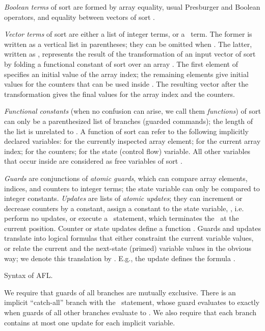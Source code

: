 \emph{Boolean terms}   of sort  are formed by array equality, usual Presburger and Boolean operators, and equality between vectors of sort .

\emph{Vector terms}  of sort  are either a list of  integer terms, or a \Fold\ term. The former is written as a vertical list in parentheses; they can be omitted when . The latter, written as , represents the result of the transformation of an input vector  of sort  by folding a functional constant  of sort  over an array .  The first element of  specifies an initial value of the array index; the remaining elements give initial values for the counters that can be used inside . The resulting vector after the transformation gives the final values for the array index and the counters.

\emph{Functional constants} (when no confusion can arise, we call them  \emph{functions})  of sort  can only be  a parenthesized list of branches (guarded commands); the length of the list is unrelated to . A function  of sort  can refer to the following implicitly declared variables:  for the currently inspected array element;  for the current array index;  for the counters;  for the state (control flow) variable. All other variables that occur inside  are considered as free variables of sort . 

\emph{Guards} are conjunctions of \emph{atomic guards}, which can compare array elements, indices, and counters to integer terms; the state variable can only be compared  to integer constants. 
\emph{Updates} are lists of \emph{atomic updates}; they can increment or decrease counters by a constant, assign a constant to the state variable, \Skip, i.e. perform no updates, or execute a \Break\ statement, which terminates the \Fold\ at the current position.  Counter or state updates define a function .
Guards and updates translate into logical formulas that either constraint the current variable values, or relate the current and the next-state (primed) variable values in the obvious way; we denote this translation by . E.g.,
the update  defines the formula . 

\begin{table}[t]

\vspace*{2mm}
\caption{Syntax of AFL.}
\label{tab:syntax}
\end{table}


We require that guards of all branches are mutually exclusive. There is an implicit ``catch-all'' branch with the \Break\ statement, whose guard evaluates to  exactly when guards of all other  branches evaluate to . We also require that each branch contains at most one update for each implicit variable.

